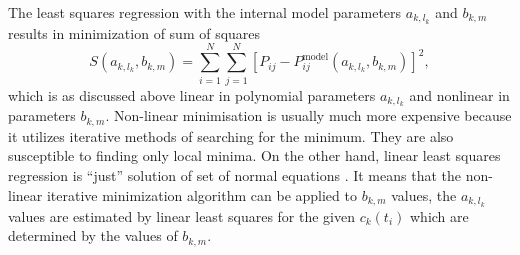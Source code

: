 The least squares regression with the internal model parameters $a_{k,l_k}$ and
$b_{k,m}$ results in minimization of sum of squares
\begin{equation*}
	S(a_{k,l_k},b_{k,m}) = \sum_{i=1}^N{\sum_{j=1}^N{
		\left[P_{ij} - P_{ij}^\text{model}(a_{k,l_k},b_{k,m})\right]^2
	}},
\end{equation*}
which is as discussed above linear in polynomial parameters $a_{k,l_k}$ and
nonlinear in parameters $b_{k,m}$.
Non-linear minimisation is usually much more expensive because it utilizes
iterative methods of searching for the minimum.
They are also susceptible to finding only local minima.
On the other hand, linear least squares regression is “just” solution of set
of normal equations
\parencite[p.~671]{NumericalRecipes}.
It means that the non-linear iterative minimization algorithm can be applied
to $b_{k,m}$ values, the $a_{k,l_k}$ values are estimated by linear least
squares for the given $c_k(t_i)$ which are determined by the values of
$b_{k,m}$.
